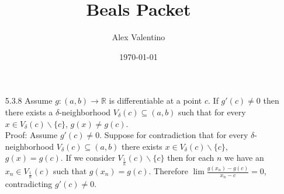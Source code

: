 \documentclass[12pt, letterpaper]{article}
\date{\today}
\author{Alex Valentino}
\title{Beals Packet}
\newcommand{\R}{\mathbb{R}}
\begin{document}
\begin{enumerate}
	\item[5.3.8] Assume $g: (a,b) \to \R$ is differentiable at a point $c$.  If $g'(c) \neq 0$ then there exists 
	a $\delta$-neighborhood $V_\delta(c) \subseteq (a,b)$ such that for every $x \in V_\delta(c)\backslash \{c\}$, 
	$g(x) \neq g(c)$.\\
	Proof: Assume $g'(c) \neq 0$.  Suppose for contradiction that for every $\delta$-neighborhood $V_\delta(c) \subseteq (a,b)$ 
	there exists $x \in V_\delta(c)\backslash \{c\}$, $g(x) = g(c)$.  If we consider $V_{\frac{1}{n}}(c)\backslash \{c\}$ then for each $n$ we have an $x_n \in V_{\frac{1}{n}}(c)$ such that $g(x_n) = g(c)$.  Therefore $\lim \frac{g(x_n)-g(c)}{x_n - c} = 0$, contradicting $g'(c) \neq 0$.  
\end{enumerate}
\end{document}
